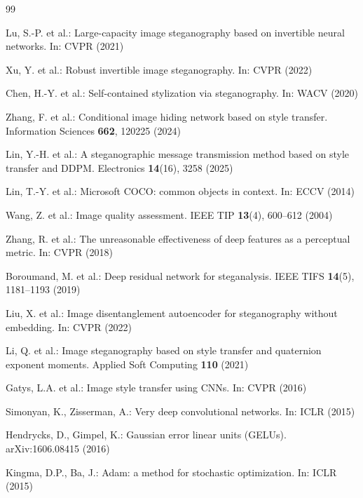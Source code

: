 \documentclass[conference]{IEEEtran}
\begin{document}
\begin{thebibliography}{99}
\scriptsize

Lu, S.-P. et al.: Large-capacity image steganography based on invertible neural networks. In: CVPR (2021)

Xu, Y. et al.: Robust invertible image steganography. In: CVPR (2022)

Chen, H.-Y. et al.: Self-contained stylization via steganography. In: WACV (2020)

Zhang, F. et al.: Conditional image hiding network based on style transfer. Information Sciences \textbf{662}, 120225 (2024)

Lin, Y.-H. et al.: A steganographic message transmission method based on style transfer and DDPM. Electronics \textbf{14}(16), 3258 (2025)

Lin, T.-Y. et al.: Microsoft COCO: common objects in context. In: ECCV (2014)

Wang, Z. et al.: Image quality assessment. IEEE TIP \textbf{13}(4), 600--612 (2004)

Zhang, R. et al.: The unreasonable effectiveness of deep features as a perceptual metric. In: CVPR (2018)

Boroumand, M. et al.: Deep residual network for steganalysis. IEEE TIFS \textbf{14}(5), 1181--1193 (2019)

Liu, X. et al.: Image disentanglement autoencoder for steganography without embedding. In: CVPR (2022)

Li, Q. et al.: Image steganography based on style transfer and quaternion exponent moments. Applied Soft Computing \textbf{110} (2021)

Gatys, L.A. et al.: Image style transfer using CNNs. In: CVPR (2016)

Simonyan, K., Zisserman, A.: Very deep convolutional networks. In: ICLR (2015)

Hendrycks, D., Gimpel, K.: Gaussian error linear units (GELUs). arXiv:1606.08415 (2016)

Kingma, D.P., Ba, J.: Adam: a method for stochastic optimization. In: ICLR (2015)

\end{thebibliography}
\end{document}
